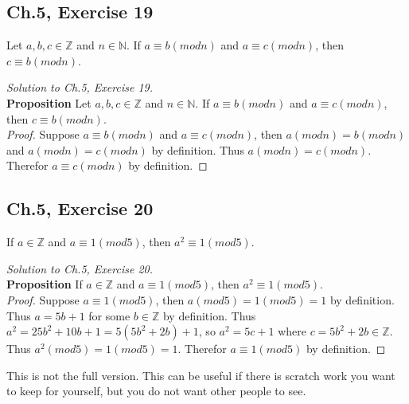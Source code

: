 \documentclass[12pt]{amsart}
\numberwithin{equation}{section}
\theoremstyle{definition}
\theoremstyle{remark}
\newif\ifnotes
\begin{document}


\subsection*{Ch.5,  Exercise 19}  Let $ a,b,c \in \mathbb{Z} $ and $ n \in \mathbb{N} $. If $ a \equiv b(mod n) $ and $ a \equiv c(mod n) $, then $ c \equiv b(mod n) $.



\begin{proof}[Solution to Ch.5,  Exercise 19]
\ \\
\textbf{Proposition} Let $ a,b,c \in \mathbb{Z} $ and $ n \in \mathbb{N} $. If $ a \equiv b(mod n) $ and $ a \equiv c(mod n) $, then $ c \equiv b(mod n) $. \\
\textit{Proof.} Suppose $ a \equiv b(mod n) $ and $ a \equiv c (mod n) $, then $ a (mod n) = b(mod n) $ and $ a (mod n) = c(mod n) $ by definition. Thus $ a (mod n) = c (mod n) $. Therefor $ a \equiv c (mod n) $ by definition.

\end{proof}



\subsection*{Ch.5,  Exercise 20}  If $ a \in \mathbb{Z} $ and $ a \equiv 1(mod 5) $, then $ a^2 \equiv 1(mod 5) $.



\begin{proof}[Solution to Ch.5,  Exercise 20]
\ \\
\textbf{Proposition} If $ a \in \mathbb{Z} $ and $ a \equiv 1(mod 5) $, then $ a^2 \equiv 1(mod 5) $. \\
\textit{Proof.} Suppose $ a \equiv 1(mod 5) $, then $ a (mod 5) = 1 (mod 5) = 1 $ by definition. Thus $ a = 5b + 1 $ for some $ b \in \mathbb{Z} $ by definition. Thus $ a^2 = 25b^2 + 10b + 1 = 5(5b^2 + 2b) + 1 $, so $ a^2 = 5c + 1 $ where $ c = 5b^2 + 2b \in \mathbb{Z}$. Thus $ a^2 (mod 5) = 1 (mod 5) = 1 $. Therefor $ a \equiv 1 (mod 5) $ by definition.

\end{proof}

\newpage


\ifnotes


\else
	This is not the full version.  This can be useful if there is scratch work you want to keep for yourself, but you do not want other people to see. 
\fi





\end{document}
